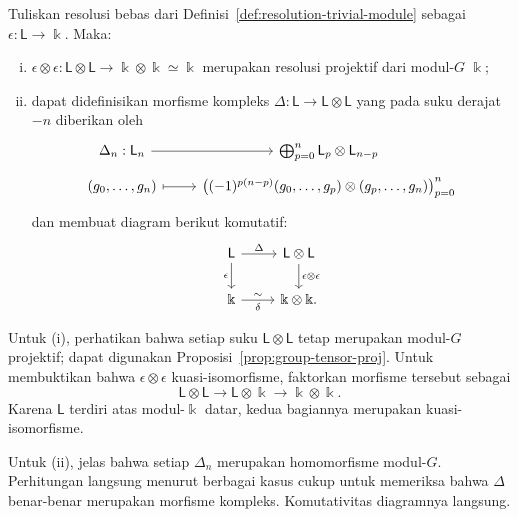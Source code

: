 \begin{lema}\label{prop:cup-resolution}
	Tuliskan resolusi bebas dari Definisi~\ref{def:resolution-trivial-module}
	sebagai $\epsilon:\mathsf{L}\to\Bbbk$. Maka:
	\begin{enumerate}[(i)]
		\item $\epsilon\otimes\epsilon:\mathsf{L}\otimes\mathsf{L}
		\to\Bbbk\otimes\Bbbk\simeq\Bbbk$ merupakan resolusi projektif dari
		modul-$G$ $\Bbbk$;
		\item dapat didefinisikan morfisme kompleks
		$\Delta:\mathsf{L}\to\mathsf{L}\otimes\mathsf{L}$ yang pada suku derajat
		$-n$ diberikan oleh
		\[\begin{tikzcd}[row sep=tiny]
			\Delta_n: \mathsf{L}_n \arrow[r] & \bigoplus_{p=0}^n \mathsf{L}_p \otimes \mathsf{L}_{n-p} \\
			(g_0, \ldots, g_n) \arrow[mapsto, r] & \left( (-1)^{p(n-p)} (g_0, \ldots, g_p) \otimes (g_p, \ldots, g_n) \right)_{p=0}^n
		\end{tikzcd}\]
		dan membuat diagram berikut komutatif:
		\[\begin{tikzcd}
			\mathsf{L} \arrow[r, "\Delta"] \arrow[d, "\epsilon"'] & \mathsf{L} \otimes \mathsf{L} \arrow[d, "{\epsilon \otimes \epsilon}"] \\
			\Bbbk \arrow[r, "\sim", "\delta"'] & \Bbbk \otimes \Bbbk .
		\end{tikzcd}\]
	\end{enumerate}
\end{lema}

\begin{bukti}
	Untuk (i), perhatikan bahwa setiap suku $\mathsf{L}\otimes\mathsf{L}$ tetap
	merupakan modul-$G$ projektif; dapat digunakan
	Proposisi~\ref{prop:group-tensor-proj}. Untuk membuktikan bahwa
	$\epsilon\otimes\epsilon$ kuasi-isomorfisme, faktorkan morfisme tersebut
	sebagai
	\[ \mathsf{L} \otimes \mathsf{L} \to \mathsf{L} \otimes \Bbbk \to \Bbbk \otimes \Bbbk. \]
	Karena $\mathsf{L}$ terdiri atas modul-$\Bbbk$ datar, kedua bagiannya
	merupakan kuasi-isomorfisme.

	Untuk (ii), jelas bahwa setiap $\Delta_n$ merupakan homomorfisme modul-$G$.
	Perhitungan langsung menurut berbagai kasus cukup untuk memeriksa bahwa
	$\Delta$ benar-benar merupakan morfisme kompleks. Komutativitas diagramnya
	langsung.
\end{bukti}

